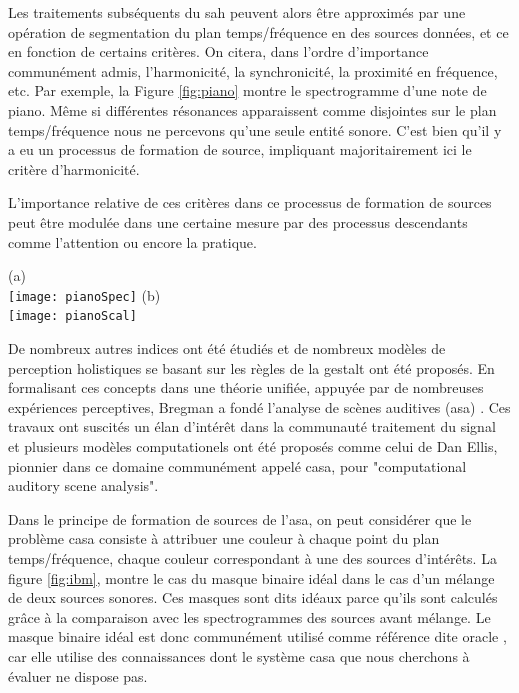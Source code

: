   Les traitements subséquents  du sah peuvent alors être approximés par une opération de segmentation du plan temps/fréquence en des sources données, et ce en fonction de certains critères.  On citera, dans l'ordre d'importance communément admis, l'harmonicité, la synchronicité, la proximité en fréquence, etc. Par exemple, la Figure \ref{fig:piano} montre le spectrogramme d'une note de piano. Même si différentes résonances apparaissent comme disjointes sur le plan temps/fréquence nous ne percevons qu'une seule entité sonore. C'est bien qu'il y a eu un processus de formation de source, impliquant majoritairement ici le critère d'harmonicité.

  L'importance relative de ces critères dans ce processus de formation de sources peut être modulée dans une certaine mesure par des processus descendants comme l'attention ou encore la pratique.

  \begin{marginfigure}
    (a) \\
    \texttt{[image: pianoSpec]}
    (b)  \\
    \texttt{[image: pianoScal]}
    \caption{Spectrogramme (a) et scalogramme (b) d'une note de piano.}
    \label{fig:piano}
  \end{marginfigure}

  De nombreux autres indices ont été étudiés et de nombreux modèles de perception holistiques se basant sur les règles de la gestalt ont été proposés. En formalisant ces concepts dans une théorie unifiée, appuyée par de nombreuses expériences perceptives, Bregman a fondé l'analyse de scènes auditives (asa) \cite{bregman1994auditory}. Ces travaux ont suscités un élan d'intérêt dans la communauté traitement du signal et plusieurs modèles computationels ont été proposés comme celui de Dan Ellis\cite{ellis}, pionnier dans ce domaine communément appelé casa, pour "computational auditory scene analysis".


  Dans le principe de formation de sources de l'asa, on peut considérer que le problème casa consiste à attribuer une couleur à chaque point du plan temps/fréquence, chaque couleur correspondant à une des sources d'intérêts. La figure \ref{fig:ibm}, montre le cas du masque binaire idéal dans le cas d'un mélange de deux sources sonores. Ces masques sont dits idéaux parce qu'ils sont calculés grâce à la comparaison avec les spectrogrammes des sources avant mélange. Le masque binaire idéal est donc communément utilisé comme référence dite \og oracle \fg, car elle utilise des connaissances dont le système casa que nous cherchons à évaluer ne dispose pas.

